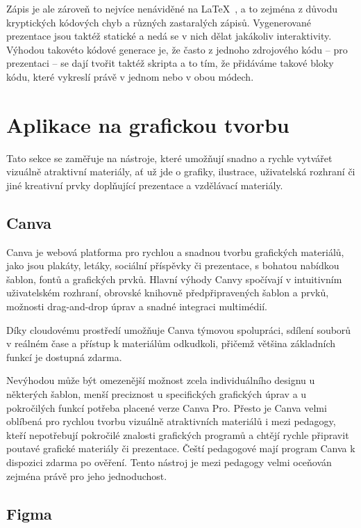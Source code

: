 Zápis je ale zároveň to nejvíce nenáviděné na \LaTeX~\cite{latex_reddit}, a to zejména z důvodu kryptických kódových chyb a různých zastaralých zápisů.
Vygenerované prezentace jsou taktéž statické a nedá se v nich dělat jakákoliv interaktivity. 
Výhodou takovéto kódové generace je, že často z jednoho zdrojového kódu -- pro prezentaci -- se dají tvořit taktéž skripta a to tím, že přidáváme takové bloky kódu, které vykreslí právě v jednom nebo v obou módech.

\section{Aplikace na grafickou tvorbu}

Tato sekce se zaměřuje na nástroje, které umožňují snadno a rychle vytvářet vizuálně atraktivní materiály, ať už jde o grafiky, ilustrace, uživatelská rozhraní či jiné kreativní prvky doplňující prezentace a vzdělávací materiály.

\subsection{Canva}\label{text:canva}

Canva je webová platforma pro rychlou a snadnou tvorbu grafických materiálů, jako jsou plakáty, letáky, sociální příspěvky či prezentace, s bohatou nabídkou šablon, fontů a grafických prvků. 
Hlavní výhody Canvy spočívají v intuitivním uživatelském rozhraní, obrovské knihovně předpřipravených šablon a prvků, možnosti drag-and-drop úprav a snadné integraci multimédií.

Díky cloudovému prostředí umožňuje Canva týmovou spolupráci, sdílení souborů v reálném čase a přístup k materiálům odkudkoli, přičemž většina základních funkcí je dostupná zdarma. 

Nevýhodou může být omezenější možnost zcela individuálního designu u některých šablon, menší preciznost u specifických grafických úprav a u pokročilých funkcí potřeba placené verze Canva Pro. 
Přesto je Canva velmi oblíbená pro rychlou tvorbu vizuálně atraktivních materiálů i mezi pedagogy, kteří nepotřebují pokročilé znalosti grafických programů a chtějí rychle připravit poutavé grafické materiály či prezentace.
Čeští pedagogové mají program Canva k dispozici zdarma po ověření. Tento nástroj je mezi pedagogy velmi oceňován zejména právě pro jeho jednoduchost.

\subsection{Figma}

